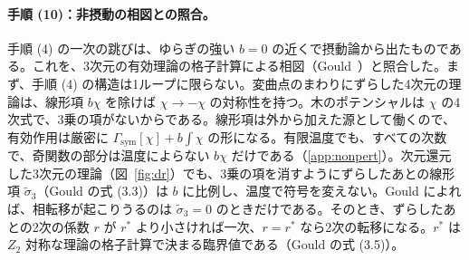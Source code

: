 \documentclass[a4paper,10pt]{ltjsarticle}
\begin{document}
\paragraph{手順 (10)：非摂動の相図との照合。}手順 (4) の一次の跳びは、ゆらぎの強い $b=0$ の近くで摂動論から出たものである。これを、3次元の有効理論の格子計算による相図（Gould~\cite{gould21}）と照合した。まず、手順 (4) の構造は1ループに限らない。変曲点のまわりにずらした4次元の理論は、線形項 $b\chi$ を除けば $\chi\to-\chi$ の対称性を持つ。木のポテンシャルは $\chi$ の4次式で、3乗の項がないからである。線形項は外から加えた源として働くので、有効作用は厳密に $\Gamma_{\mathrm{sym}}[\chi]+b\int\chi$ の形になる。有限温度でも、すべての次数で、奇関数の部分は温度によらない $b\chi$ だけである（\ref{app:nonpert}）。次元還元した3次元の理論（図~\ref{fig:dr}）でも、3乗の項を消すようにずらしたあとの線形項 $\tilde\sigma_3$（Gould の式 (3.3)）は $b$ に比例し、温度で符号を変えない。Gould によれば、相転移が起こりうるのは $\tilde\sigma_3=0$ のときだけである。そのとき、ずらしたあとの2次の係数 $r$ が $r^*$ より小さければ一次、$r=r^*$ なら2次の転移になる。$r^*$ は $Z_2$ 対称な理論の格子計算で決まる臨界値である（Gould の式 (3.5)）。
\end{document}
